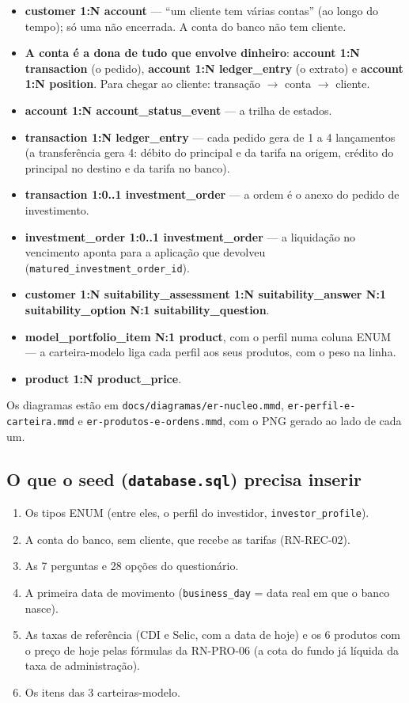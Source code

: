 \documentclass[11pt,a4paper]{article}
\newcommand{\tb}[1]{\texttt{#1}}           %
\begin{document}
\begin{itemize}
  \item \textbf{customer 1:N account} --- ``um cliente tem várias contas'' (ao longo do tempo); só uma não encerrada. A conta do banco não tem cliente.
  \item \textbf{A conta é a dona de tudo que envolve dinheiro}: \textbf{account 1:N transaction} (o pedido), \textbf{account 1:N ledger_entry} (o extrato) e \textbf{account 1:N position}. Para chegar ao cliente: transação $\to$ conta $\to$ cliente.
  \item \textbf{account 1:N account_status_event} --- a trilha de estados.
  \item \textbf{transaction 1:N ledger_entry} --- cada pedido gera de 1 a 4 lançamentos (a transferência gera 4: débito do principal e da tarifa na origem, crédito do principal no destino e da tarifa no banco).
  \item \textbf{transaction 1:0..1 investment_order} --- a ordem é o anexo do pedido de investimento.
  \item \textbf{investment_order 1:0..1 investment_order} --- a liquidação no vencimento aponta para a aplicação que devolveu (\tb{matured_investment_order_id}).
  \item \textbf{customer 1:N suitability_assessment 1:N suitability_answer N:1 suitability_option N:1 suitability_question}.
  \item \textbf{model_portfolio_item N:1 product}, com o perfil numa coluna ENUM --- a carteira-modelo liga cada perfil aos seus produtos, com o peso na linha.
  \item \textbf{product 1:N product_price}.
\end{itemize}

Os diagramas estão em \tb{docs/diagramas/er-nucleo.mmd}, \tb{er-perfil-e-carteira.mmd} e
\tb{er-produtos-e-ordens.mmd}, com o PNG gerado ao lado de cada um.

\subsection{O que o seed (\tb{database.sql}) precisa inserir}

\begin{enumerate}
  \item Os tipos ENUM (entre eles, o perfil do investidor, \tb{investor_profile}).
  \item A conta do banco, sem cliente, que recebe as tarifas (RN-REC-02).
  \item As 7 perguntas e 28 opções do questionário.
  \item A primeira data de movimento (\tb{business_day} = data real em que o banco nasce).
  \item As taxas de referência (CDI e Selic, com a data de hoje) e os 6 produtos com o preço de
        hoje pelas fórmulas da RN-PRO-06 (a cota do fundo já líquida da taxa de administração).
  \item Os itens das 3 carteiras-modelo.
\end{enumerate}
\end{document}
